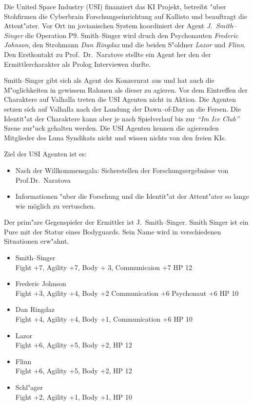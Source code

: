 Die United Space Industry (USI) finanziert das KI Projekt, betreibt "uber Stohfirmen die Cyberbrain Forschungseinrichtung auf Kallisto und beauftragt die Attent"ater. Vor Ort im jovianischen System koordiniert der Agent \emph{J.~Smith--Singer} die Operation P9. Smith--Singer wird druch den Psychonauten \emph{Frederic Johnson}, den Strohmann \emph{Dan Ringdaz} und die beiden S"oldner \emph{Lazor} und \emph{Flinn}. Den Erstkontakt zu Prof.~Dr.~Naratove stellte ein Agent her den der Ermittlercharakter als Prolog Interviewen durfte.

Smith--Singer gibt sich als Agent des Konzernrat aus und hat auch die M"oglichkeiten in gewissem Rahmen als dieser zu agieren. Vor dem Eintreffen der Charaktere auf Valhalla treten die USI Agenten nicht in Aktion. Die Agenten setzen sich auf Valhalla nach der Landung der Dawn--of-Day an die Fersen. Die Identit"at der Charaktere kann aber je nach Spielverlauf bis zur \emph{"`Im Ice Club"'} Szene zur"uck gehalten werden. Die USI Agenten kennen die agierenden Mitglieder des Luna Syndikats nicht und wissen nichts von den freien KIs.

Ziel der USI Agenten ist es:

\begin{itemize}
    \item Nach der Willkommensgala: Sicherstellen der Forschungsergebnisse von Prof.Dr.~Naratova
    \item Informationen "uber die Forschung und die Identit"at der Attent"ater so lange wie möglich zu vertuschen.    
\end{itemize}

Der prim"are Gegenspieler der Ermittler ist J.~Smith--Singer. Smith Singer ist ein Pure mit der Statur eines Bodyguards. Sein Name wird in verschiedenen Situationen erw"ahnt.

\begin{itemize}
    \item Smith--Singer \\
          Fight +7, Agility +7, Body + 3, Communicaion +7 HP 12
    \item Frederic Johnson\\
          Fight +3, Agility +4, Body +2 Communication +6 Psychonaut +6 HP 10
    \item Dan Ringdaz\\
          Fight +4, Agility +4, Body +1, Communication +6 HP 10
    \item Lazor\\
          Fight +6, Agility +5,  Body +2, HP 12
    \item Flinn\\
          Fight +6, Agility +5,  Body +2, HP 12
    \item Schl"ager\\
          Fight +2, Agility +1, Body +1, HP 10
\end{itemize}

